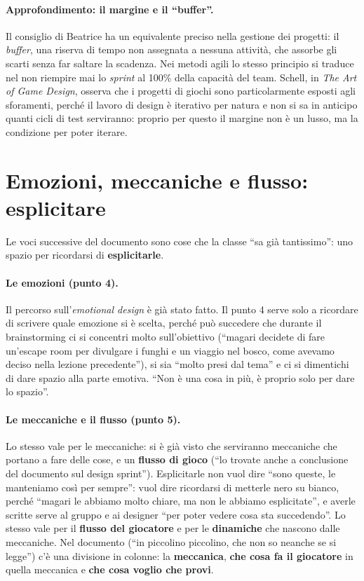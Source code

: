 \paragraph{Approfondimento: il margine e il ``buffer''.} Il consiglio di Beatrice ha
un equivalente preciso nella gestione dei progetti: il \emph{buffer}, una riserva di
tempo non assegnata a nessuna attività, che assorbe gli scarti senza far saltare la
scadenza. Nei metodi agili lo stesso principio si traduce nel non riempire mai lo
\emph{sprint} al 100\% della capacità del team. Schell, in \emph{The Art of Game
Design}, osserva che i progetti di giochi sono particolarmente esposti agli
sforamenti, perché il lavoro di design è iterativo per natura e non si sa in anticipo
quanti cicli di test serviranno: proprio per questo il margine non è un lusso, ma la
condizione per poter iterare.

\section{Emozioni, meccaniche e flusso: esplicitare}
\label{a9:sec:esplicitare}

Le voci successive del documento sono cose che la classe ``sa già tantissimo'': uno
spazio per ricordarsi di \textbf{esplicitarle}.

\paragraph{Le emozioni (punto 4).} Il percorso sull'\emph{emotional design} è già
stato fatto. Il punto 4 serve solo a ricordare di scrivere quale emozione si è
scelta, perché può succedere che durante il brainstorming ci si concentri molto
sull'obiettivo (``magari decidete di fare un'escape room per divulgare i funghi e un
viaggio nel bosco, come avevamo deciso nella lezione precedente''), si sia ``molto
presi dal tema'' e ci si dimentichi di dare spazio alla parte emotiva. ``Non è una
cosa in più, è proprio solo per dare lo spazio''.

\paragraph{Le meccaniche e il flusso (punto 5).} Lo stesso vale per le meccaniche: si
è già visto che serviranno meccaniche che portano a fare delle cose, e un
\textbf{flusso di gioco} (``lo trovate anche a conclusione del documento sul design
sprint''). Esplicitarle non vuol dire ``sono queste, le manteniamo così per sempre'':
vuol dire ricordarsi di metterle nero su bianco, perché ``magari le abbiamo molto
chiare, ma non le abbiamo esplicitate'', e averle scritte serve al gruppo e ai
designer ``per poter vedere cosa sta succedendo''. Lo stesso vale per il
\textbf{flusso del giocatore} e per le \textbf{dinamiche} che nascono dalle
meccaniche. Nel documento (``in piccolino piccolino, che non so neanche se si
legge'') c'è una divisione in colonne: la \textbf{meccanica}, \textbf{che cosa fa il
giocatore} in quella meccanica e \textbf{che cosa voglio che provi}.

